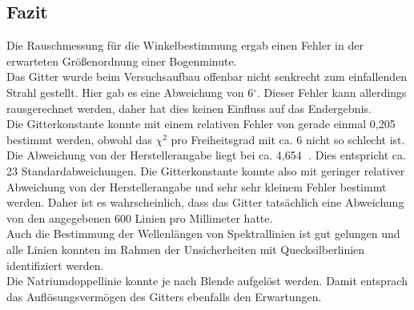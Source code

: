 \documentclass[12pt,a4paper]{article}
\begin{document}
\subsection{Fazit}
Die Rauschmessung für die Winkelbestimmung ergab einen Fehler in der erwarteten Größenordnung einer Bogenminute.\\
Das Gitter wurde beim Versuchsaufbau offenbar nicht senkrecht zum einfallenden Strahl gestellt. Hier gab es eine Abweichung von 6$^{\circ}$. Dieser Fehler kann allerdings rausgerechnet werden, daher hat dies keinen Einfluss auf das Endergebnis.\\
Die Gitterkonstante konnte mit einem relativen Fehler von gerade einmal 0,205 \textperthousand $\;$ bestimmt werden, obwohl das $\chi ^2$ pro Freiheitsgrad mit ca. 6 nicht so schlecht ist. Die Abweichung von der Herstellerangabe liegt bei ca. 4,654 \textperthousand $\;$. Dies entspricht ca. 23 Standardabweichungen. Die Gitterkonstante konnte also mit geringer relativer Abweichung von der Herstellerangabe und sehr sehr kleinem Fehler bestimmt werden. Daher ist es wahrscheinlich, dass das Gitter tatsächlich eine Abweichung von den angegebenen 600 Linien pro Millimeter hatte.\\
Auch die Bestimmung der Wellenlängen von Spektrallinien ist gut gelungen und alle Linien konnten im Rahmen der Unsicherheiten mit Quecksilberlinien identifiziert werden.\\
Die Natriumdoppellinie konnte je nach Blende aufgelöst werden. Damit entsprach das Auflösungsvermögen des Gitters ebenfalls den Erwartungen.
	
	
\end{document}
